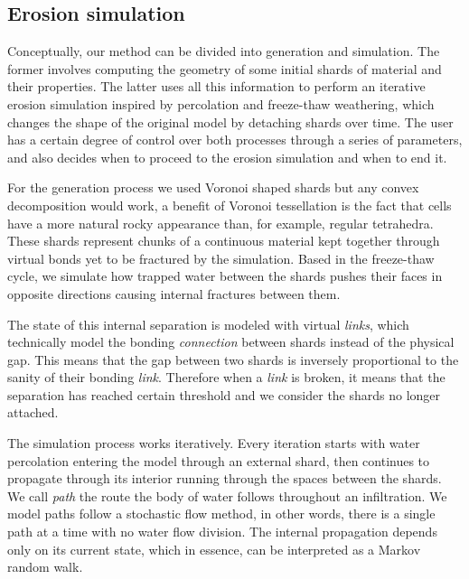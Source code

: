 \subsection{Erosion simulation}

Conceptually, our method can be divided into generation and simulation. The former involves computing the geometry of some initial shards of material and their properties. The latter uses all this information to perform an iterative erosion simulation inspired by percolation and freeze-thaw weathering, which changes the shape of the original model by detaching shards over time. The user has a certain degree of control over both processes through a series of parameters, and also decides when to proceed to the erosion simulation and when to end it.

\vspace{0.5\baselineskip}
For the generation process we used Voronoi shaped shards but any convex decomposition would work, a benefit of Voronoi tessellation is the fact that cells have a more natural rocky appearance than, for example, regular tetrahedra. These shards represent chunks of a continuous material kept together through virtual bonds yet to be fractured by the simulation. Based in the freeze-thaw cycle, we simulate how trapped water between the shards pushes their faces in opposite directions causing internal fractures between them. 

\vspace{0.5\baselineskip}
The state of this internal separation is modeled with virtual \textit{links}, which technically model the bonding \textit{connection} between shards instead of the physical gap. This means that the gap between two shards is inversely proportional to the sanity of their bonding \textit{link}. Therefore when a \textit{link} is broken, it means that the separation has reached certain threshold and we consider the shards no longer attached.

\vspace{0.5\baselineskip}
The simulation process works iteratively. Every iteration starts with water percolation entering the model through an external shard, then continues to propagate through its interior running through the spaces between the shards. We call \textit{path} the route the body of water follows throughout an infiltration. We model paths follow a stochastic flow method, in other words, there is a single path at a time with no water flow division. The internal propagation depends only on its current state, which in essence, can be interpreted as a Markov random walk. 

